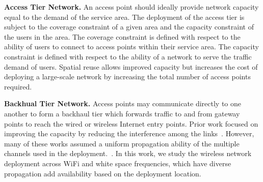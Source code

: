 \textbf{Access Tier Network.} 
An access point should ideally provide network capacity equal to the demand of the service 
area. The deployment of the access tier is subject to the coverage constraint of a given area and the capacity 
constraint of the users in the area. The coverage constraint is defined with respect to the ability of 
users to connect to access points within their service area. The capacity constraint is defined with 
respect to the ability of a network to serve the traffic demand of users. Spatial reuse allows improved 
capacity but increases the cost of deploying a large-scale network by increasing the total number of access points 
required. 

\textbf{Backhual Tier Network.} 
Access points may communicate directly to one another to form a backhaul tier which forwards traffic to and from 
gateway points to reach the wired or wireless Internet entry points. 
Prior work focused on improving the capacity 
by reducing the interference among the links~\cite{si2010overview,doraghinejad2014channel}. 
However, many of these works assumed a uniform propagation ability of the multiple channels used in the deployment.~\cite{doraghinejad2014channel}. 
In this work, we study the wireless network deployment across WiFi and white space frequencies, which have diverse 
propagation add availability based on the deployment location.





 







